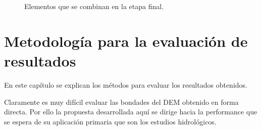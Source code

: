 \documentclass[10pt,a4paper, twoside]{report}
\begin{document}
\begin{figure}[H]
	\centering
	\caption{Elementos que se combinan en la etapa final.}
	\label{elementosACombinar}
\end{figure}

\chapter{Metodología para la evaluación de resultados}

En este capítulo se explican los métodos para evaluar los resultados obtenidos.

Claramente es muy difícil evaluar las bondades del DEM obtenido en forma directa. Por ello la propuesta desarrollada aquí se dirige hacia la performance que se espera de su aplicación primaria que son los estudios hidrológicos.
\end{document}
